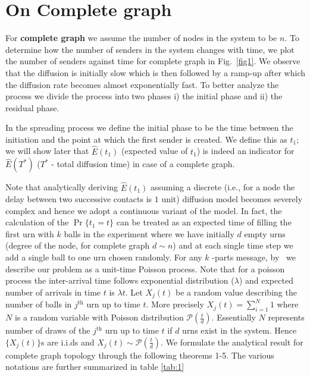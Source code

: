 \noindent
\section{On Complete graph}
\label{res_complete}
\noindent For {\bf complete graph} we assume the
number of nodes in the system to be $n$. 
To determine how the number of
senders in the system changes with time, we plot the number of senders
against time for complete graph in Fig.~\ref{fig1}. 
We observe that the diffusion is initially slow which is then followed by a ramp-up after which the diffusion rate becomes almost exponentially fast.
To better analyze the process we divide the process into two phases i) the initial phase and ii) the residual phase. 


  In the spreading process we define the initial phase to be the time between the
initiation and the point at which the first sender is created. We
define this as $t_1$; we will show later that $\hat E(t_1)$ (expected value of $t_1$) is
indeed an indicator for $\hat E(T^*)$ ($T^*$ - 
total diffusion time) in case of a complete graph.

Note that analytically deriving  $\hat E(t_1)$ assuming a  discrete 
(i.e., for a node the delay between two successive contacts is $1$ unit) diffusion model becomes severely complex and hence we adopt a continuous 
variant of the model. In fact, the calculation of the $\Pr \{ t_{1}=t\}$ can be treated as an expected time of filling the first urn with $k$
balls in the experiment where we have initially $d$ empty urns (degree of the node, for complete graph $d \sim n$) and at each
single time step we add a single ball to one urn chosen randomly. 
 For any $k$%
-parts message, by~\cite{kaplan1977generalization} we describe our problem
as a unit-time Poisson process. Note that for a poisson process the inter-arrival time follows exponential distribution ($\lambda$) and expected number of arrivals in time $t$ is $\lambda t$.  
 Let 
$X_{j}(t)$ be a random value describing the number of balls in $j^\textrm{th}$ urn up
to time $t$. More precisely $X_{j}(t)=\sum_{i=1}^{N}1$ where $N$ is a random variable 
with Poisson distribution $\mathcal{P}(\frac{t}{d})$. Essentially $N$ represents number of draws
of the $j^\textrm{th}$ urn up to time $t$ if $d$ urns exist in the system.
Hence $\{X_{j}(t)\}$s are i.i.ds and $X_{j}(t)\sim\mathcal{P}(\frac{t}{d}%
) $.  
{We formulate the analytical result for complete graph topology through the following theorems 1-5. The various notations are further 
summarized in table \ref{tab:1}}



